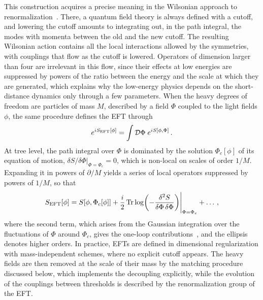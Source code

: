 This construction acquires a precise meaning in the Wilsonian approach to
renormalization~\cite{Wilson:1971bg,Wilson:1973jj,Polchinski:1983gv}. There, a quantum field theory
is always defined with a cutoff, and lowering the cutoff amounts to integrating out, in the path
integral, the modes with momenta between the old and the new cutoff. The resulting Wilsonian action
contains all the local interactions allowed by the symmetries, with couplings that flow as the
cutoff is lowered. Operators of dimension larger than four are irrelevant in this flow, since their
effects at low energies are suppressed by powers of the ratio between the energy and the scale at
which they are generated, which explains why the low-energy physics depends on the short-distance
dynamics only through a few parameters. When the heavy degrees of freedom are particles of mass $M$,
described by a field $\Phi$ coupled to the light fields $\phi$, the same procedure defines the EFT
through
\begin{equation}\label{eq:intro_pathintegral}
    e^{iS_{\rm EFT}[\phi]} = \int\mathcal D\Phi\;e^{iS[\phi,\Phi]}\,.
\end{equation}
At tree level, the path
integral over $\Phi$ is dominated by the solution $\Phi_c[\phi]$ of its equation of motion, $\delta
S/\delta\Phi|_{\Phi=\Phi_c}=0$, which is non-local on scales of order $1/M$. Expanding it in powers
of $\partial/M$ yields a series of local operators suppressed by powers of $1/M$, so that
\begin{equation}\label{eq:intro_treeloop}
    S_{\rm EFT}[\phi] = S[\phi,\Phi_c[\phi]] + \frac{i}{2}\Tr \log\!\left(-\frac{\delta^2S}{\delta\Phi\,\delta\Phi}\right)\!\Bigg|_{\Phi=\Phi_c}+\dots\,,
\end{equation}
where the second term, which arises from the Gaussian integration over the fluctuations of $\Phi$
around $\Phi_c$, gives the one-loop contributions~\cite{Henning:2014wua}, and the ellipsis denotes
higher orders. In practice, EFTs are defined in dimensional regularization with mass-independent
schemes, where no explicit cutoff appears. The heavy fields are then removed at the scale of their
mass by the matching procedure discussed below, which implements the decoupling explicitly, while
the evolution of the couplings between thresholds is described by the renormalization group of the
EFT.


